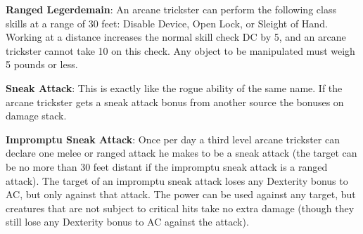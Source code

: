 \textbf{Ranged Legerdemain}: An arcane trickster can perform the following class skills at a range of 30 feet: Disable Device, Open Lock, or Sleight of Hand. Working at a distance increases the normal skill check DC by 5, and an arcane trickster cannot take 10 on this check. Any object to be manipulated must weigh 5 pounds or less.

\textbf{Sneak Attack}: This is exactly like the rogue ability of the same name. If the arcane trickster gets a sneak attack bonus from another source the bonuses on damage stack.

\textbf{Impromptu Sneak Attack}: Once per day a third level arcane trickster can declare one melee or ranged attack he makes to be a sneak attack (the target can be no more than 30 feet distant if the impromptu sneak attack is a ranged attack). The target of an impromptu sneak attack loses any Dexterity bonus to AC, but only against that attack. The power can be used against any target, but creatures that are not subject to critical hits take no extra damage (though they still lose any Dexterity bonus to AC against the attack).